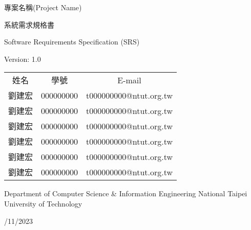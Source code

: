 \documentclass[a4paper, 12pt]{article}
\def\myProjectName{專案名稱(Project Name)}
\def\myVersion{1.0}
\newcommand\TwentyTitle{\fontsize{20pt}{24pt}\selectfont}
\newcommand\EighteenTitle{\fontsize{18pt}{20pt}\selectfont}
\newcommand\SixteenTitle{\fontsize{16pt}{18pt}\selectfont}
\begin{document}
\thispagestyle{empty}
\begin{center}
    {\TwentyTitle \myProjectName \par}
    \vspace{6cm}
    {\TwentyTitle 系統需求規格書 \par}
    {\EighteenTitle Software Requirements Specification (SRS) \par}
    {\SixteenTitle Version: \myVersion \par}
    \vspace{4cm}
    {\SixteenTitle
    \begin{tabular}{ccc}
      姓名 & 學號 & E-mail \\[0.2em]
      劉建宏 & 000000000 & t000000000@ntut.org.tw \\
      劉建宏 & 000000000 & t000000000@ntut.org.tw \\
      劉建宏 & 000000000 & t000000000@ntut.org.tw \\
      劉建宏 & 000000000 & t000000000@ntut.org.tw \\
      劉建宏 & 000000000 & t000000000@ntut.org.tw \\
      劉建宏 & 000000000 & t000000000@ntut.org.tw \\
    \end{tabular}
    \par}
    \vspace{2cm}
    {\SixteenTitle Department of Computer Science \& Information Engineering National Taipei University of Technology \par}
    \vspace{16pt}
    {\SixteenTitle 10/11/2023 \par}
\end{center}
\clearpage

\renewcommand{\contentsname}{目錄 (Table of Contents)}
\tableofcontents
\newpage



\end{document}
